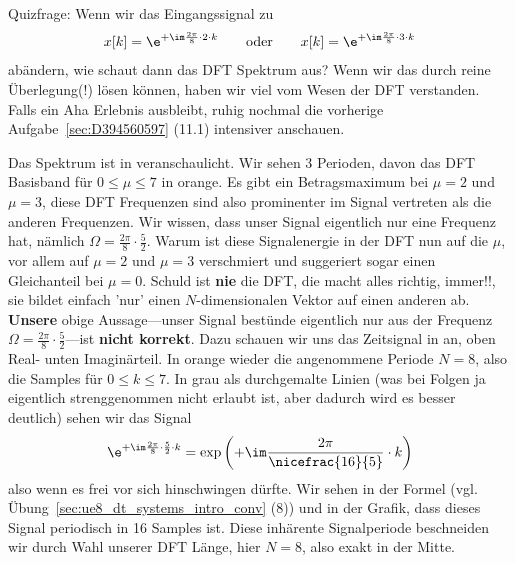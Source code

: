 \begin{ExCalc}
Quizfrage: Wenn wir das Eingangssignal zu
\begin{align}
x[k] = \e^{+\im \frac{2\pi}{8} \cdot 2 \cdot k}
\qquad\text{oder}\qquad
x[k] = \e^{+\im \frac{2\pi}{8} \cdot 3 \cdot k}
\end{align}
abändern, wie schaut dann das DFT Spektrum aus? Wenn wir das durch reine
Überlegung(!) lösen können, haben wir viel vom Wesen der DFT
verstanden.
%
Falls ein Aha Erlebnis ausbleibt, ruhig nochmal die vorherige Aufgabe~\ref{sec:D394560597} (11.1)
intensiver anschauen.

\end{ExCalc}

\begin{Loesung}
%
%
Das Spektrum ist in  veranschaulicht. Wir sehen
3 Perioden, davon das DFT Basisband für $0\leq \mu \leq 7$ in orange.
Es gibt ein Betragsmaximum bei $\mu=2$ und $\mu=3$, diese DFT Frequenzen sind
also prominenter im Signal vertreten als die anderen Frequenzen.
%
Wir wissen, dass unser Signal eigentlich nur eine Frequenz hat, nämlich
$\Omega=\frac{2\pi}{8}\cdot\frac{5}{2}$.
Warum ist diese Signalenergie in der DFT nun auf die $\mu$, vor allem auf $\mu=2$ und
$\mu=3$  verschmiert und suggeriert sogar einen Gleichanteil bei $\mu=0$.
%
Schuld ist \textbf{nie} die DFT, die macht alles richtig, immer!!, sie bildet
einfach 'nur' einen $N$-dimensionalen Vektor auf einen anderen ab.
%
\textbf{Unsere} obige Aussage---unser Signal bestünde eigentlich nur aus der Frequenz
$\Omega=\frac{2\pi}{8}\cdot\frac{5}{2}$---ist \textbf{nicht korrekt}.
Dazu schauen wir uns das Zeitsignal in  an, oben
Real- unten Imaginärteil. In orange wieder die angenommene Periode $N=8$, also
die Samples für $0 \leq k \leq 7$.
In grau als durchgemalte Linien (was bei Folgen ja eigentlich strenggenommen
nicht erlaubt ist, aber dadurch wird es besser deutlich) sehen wir das Signal
\begin{align}
\e^{+\im \frac{2\pi}{8} \cdot \frac{5}{2} \cdot k} =
\exp\left(+\im \frac{2\pi}{\nicefrac{16}{5}} \cdot k\right)
\end{align}
also wenn es frei vor sich hinschwingen dürfte.
Wir sehen in der Formel (vgl. Übung~\ref{sec:ue8_dt_systems_intro_conv} (8))
und in der Grafik, dass dieses Signal periodisch in 16 Samples ist.
%
Diese inhärente Signalperiode beschneiden wir durch Wahl unserer DFT Länge,
hier $N=8$, also exakt in der Mitte.

\end{Loesung}
